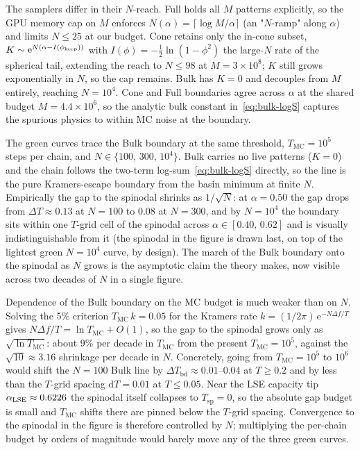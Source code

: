 \documentclass[letterpaper]{article} %
\newcommand{\e}{{\mathrm{e}}}
\newcommand{\dd}{{\mathrm{d}}}
\begin{document}
The samplers differ in their $N$-reach.  Full holds all $M$
patterns explicitly, so the GPU memory cap on $M$ enforces
$N(\alpha) = \lceil \log M / \alpha \rceil$ (an "$N$-ramp" along
$\alpha$) and limits $N \le 25$ at our budget.  Cone retains only
the in-cone subset, $K \sim \e^{N(\alpha - I(\phi_{\rm keep}))}$ with
$I(\phi) = -\tfrac12 \ln(1 - \phi^2)$ the large-$N$ rate of the
spherical tail, extending the reach to $N \le 98$ at
$M = 3 \times 10^8$; $K$ still grows exponentially in $N$, so the cap
remains.  Bulk has $K = 0$ and decouples from $M$ entirely, reaching
$N = 10^4$.  Cone and Full boundaries agree across $\alpha$ at the
shared budget $M = 4.4 \times 10^6$, so the analytic bulk constant
in~\eqref{eq:bulk-logS} captures the spurious physics to within MC
noise at the boundary.

The green curves trace the Bulk boundary at the same threshold,
$T_{\mathrm{MC}} = 10^5$ steps per chain, and
$N \in \{100,\, 300,\, 10^4\}$.  Bulk carries no live patterns ($K = 0$)
and the chain follows the two-term log-sum~\eqref{eq:bulk-logS} directly,
so the line is the pure Kramers-escape boundary from the basin minimum
at finite $N$.  Empirically the gap to the spinodal shrinks as
$1/\sqrt N$: at $\alpha = 0.50$ the gap drops from $\Delta T \approx
0.13$ at $N = 100$ to $0.08$ at $N = 300$, and by $N = 10^4$ the
boundary sits within one $T$-grid cell of the spinodal across
$\alpha \in [0.40,\, 0.62]$ and is visually indistinguishable from it
(the spinodal in the figure is drawn last, on top of the lightest green
$N = 10^4$ curve, by design).  The march of the Bulk boundary onto the
spinodal as $N$ grows is the asymptotic claim the theory makes, now
visible across two decades of $N$ in a single figure.

Dependence of the Bulk boundary on the MC budget is much weaker than on
$N$.  Solving the 5\% criterion $T_{\mathrm{MC}}\,k = 0.05$ for the
Kramers rate $k = (1/2\pi)\,\e^{-N\Delta f / T}$ gives
$N\Delta f / T = \ln T_{\mathrm{MC}} + O(1)$, so the gap to the spinodal
grows only as $\sqrt{\ln T_{\mathrm{MC}}}$: about 9\% per decade in
$T_{\mathrm{MC}}$ from the present $T_{\mathrm{MC}} = 10^5$, against the
$\sqrt{10} \approx 3.16$ shrinkage per decade in $N$.  Concretely, going
from $T_{\mathrm{MC}} = 10^5$ to $10^6$ would shift the $N = 100$ Bulk
line by $\Delta T_{\mathrm{bd}} \approx 0.01$--$0.04$ at $T \ge 0.2$ and
by less than the $T$-grid spacing $\dd T = 0.01$ at $T \le 0.05$.  Near
the LSE capacity tip $\alpha_{\rm LSE} \approx 0.6226$ the spinodal
itself collapses to $T_{\mathrm{sp}} = 0$, so the absolute gap budget is
small and $T_{\mathrm{MC}}$ shifts there are pinned below the $T$-grid
spacing.  Convergence to the spinodal in the figure is therefore
controlled by $N$; multiplying the per-chain budget by orders of
magnitude would barely move any of the three green curves.
\end{document}
